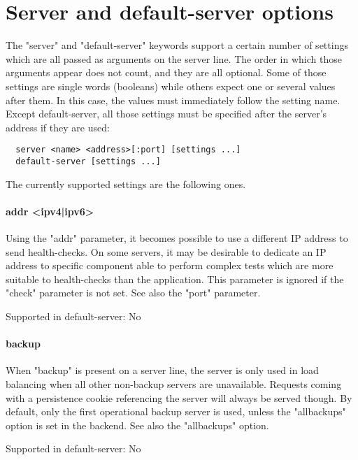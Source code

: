 \chapter{Server and default-server options}

The "server" and "default-server" keywords support a certain number of settings
which are all passed as arguments on the server line. The order in which those
arguments appear does not count, and they are all optional. Some of those
settings are single words (booleans) while others expect one or several values
after them. In this case, the values must immediately follow the setting name.
Except default-server, all those settings must be specified after the server's
address if they are used:

\begin{verbatim}
  server <name> <address>[:port] [settings ...]
  default-server [settings ...]
\end{verbatim}

The currently supported settings are the following ones.

\subsubsection[addr]{addr <ipv4|ipv6>}
  Using the "addr" parameter, it becomes possible to use a different IP address
  to send health-checks. On some servers, it may be desirable to dedicate an IP
  address to specific component able to perform complex tests which are more
  suitable to health-checks than the application. This parameter is ignored if
  the "check" parameter is not set. See also the "port" parameter.

  Supported in default-server: No

\subsubsection[backup]{backup}
  When "backup" is present on a server line, the server is only used in load
  balancing when all other non-backup servers are unavailable. Requests coming
  with a persistence cookie referencing the server will always be served
  though. By default, only the first operational backup server is used, unless
  the "allbackups" option is set in the backend. See also the "allbackups"
  option.

  Supported in default-server: No

